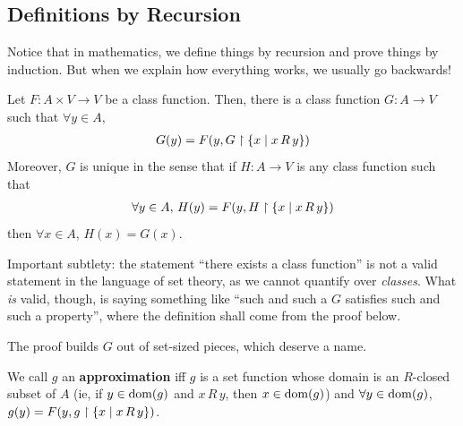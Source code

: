 \subsection{Definitions by Recursion}

Notice that in mathematics, we define things by recursion and prove things by induction. But when we explain how everything works, we usually go backwards!

\begin{boxtheorem}\label{Ch2:Thm:Recursion}
    Let $F : A \times V \to V$ be a class function. Then, there is a class function $G : A \to V$ such that $\forall y \in A$,
    \begin{align*}
        G(y) = F\!\left( y, G \restriction \left\{ x \; \middle\vert \; x \, R \, y \right\} \right)
    \end{align*}
    Moreover, $G$ is unique in the sense that if $H : A \to V$ is any class function such that
    \begin{align*}
        \forall y \in A,\, H(y) = F\!\left( y, H \restriction \left\{ x \; \middle\vert \; x \, R \, y \right\} \right)
    \end{align*}
    then $\forall x \in A$, $H(x) = G(x)$.
\end{boxtheorem}
\begin{boxwarning}
    Important subtlety: the statement ``there exists a class function'' is not a valid statement in the language of set theory, as we cannot quantify over \textit{classes}. What \textit{is} valid, though, is saying something like ``such and such a $G$ satisfies such and such a property'', where the definition shall come from the proof below.
\end{boxwarning}

The proof builds $G$ out of set-sized pieces, which deserve a name.

\begin{boxdefinition}[Approximation]
    We call $g$ an \textbf{approximation} iff $g$ is a set function whose domain is an $R$-closed subset of $A$ (ie, if $y \in \operatorname{dom}\!\left( g \right)$ and $x \, R \, y$, then $x \in \operatorname{dom}\!\left( g \right)$) and $\forall y \in \operatorname{dom}\!\left( g \right)$, $g(y) = F\!\left( y, g \restriction \left\{ x \; \middle\vert \; x \, R \, y \right\} \right)$.
\end{boxdefinition}

